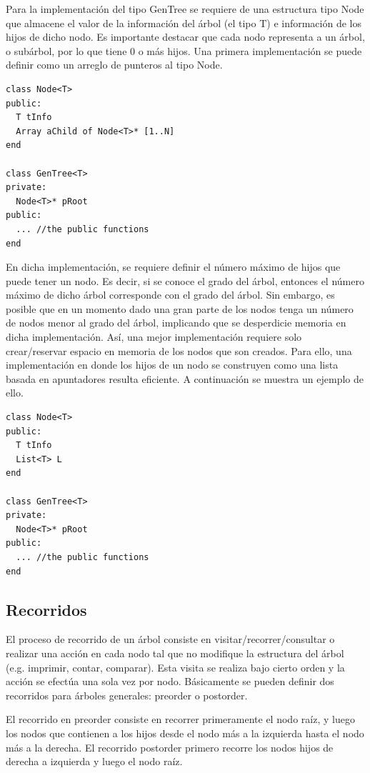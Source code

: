 Para la implementación del tipo GenTree se requiere de una estructura tipo Node que almacene el valor de la información del árbol (el tipo T) e información de los hijos de dicho nodo. Es importante destacar que cada nodo representa a un árbol, o subárbol, por lo que tiene 0 o más hijos. Una primera implementación se puede definir como un arreglo de punteros al tipo Node.

\begin{lstlisting}[upquote=true, language=pseudo]
class Node<T>
public:
  T tInfo
  Array aChild of Node<T>* [1..N]
end

class GenTree<T>
private:
  Node<T>* pRoot
public:
  ... //the public functions
end
\end{lstlisting}

En dicha implementación, se requiere definir el número máximo de hijos que puede tener un nodo. Es decir, si se conoce el grado del árbol, entonces el número máximo de dicho árbol corresponde con el grado del árbol. Sin embargo, es posible que en un momento dado una gran parte de los nodos tenga un número de nodos menor al grado del árbol, implicando que se desperdicie memoria en dicha implementación. Así, una mejor implementación requiere solo crear/reservar espacio en memoria de los nodos que son creados. Para ello, una implementación en donde los hijos de un nodo se construyen como una lista basada en apuntadores resulta eficiente. A continuación se muestra un ejemplo de ello.

\begin{lstlisting}[upquote=true, language=pseudo]
class Node<T>
public:
  T tInfo
  List<T> L
end

class GenTree<T>
private:
  Node<T>* pRoot
public:
  ... //the public functions
end
\end{lstlisting}

\subsection{Recorridos}

El proceso de recorrido de un árbol consiste en visitar/recorrer/consultar o realizar una acción en cada nodo tal que no modifique la estructura del árbol (e.g. imprimir, contar, comparar). Esta visita se realiza bajo cierto orden y la acción se efectúa una sola vez por nodo. Básicamente se pueden definir dos recorridos para árboles generales: preorder o postorder.

El recorrido en preorder consiste en recorrer primeramente el nodo raíz, y luego los nodos que contienen a los hijos desde el nodo más a la izquierda hasta el nodo más a la derecha. El recorrido postorder primero recorre los nodos hijos de derecha a izquierda y luego el nodo raíz.

